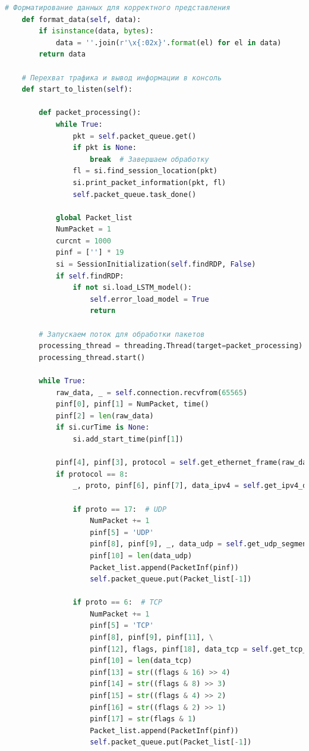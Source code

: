 \documentclass[spec, och, diploma]{SCWorks}
\begin{document}
\begin{lstlisting}[language=Python]
    # Форматирование данных для корректного представления
    def format_data(self, data):
        if isinstance(data, bytes):
            data = ''.join(r'\x{:02x}'.format(el) for el in data)
        return data

    # Перехват трафика и вывод информации в консоль
    def start_to_listen(self):
        
        def packet_processing():
            while True:
                pkt = self.packet_queue.get()
                if pkt is None:
                    break  # Завершаем обработку
                fl = si.find_session_location(pkt)
                si.print_packet_information(pkt, fl)
                self.packet_queue.task_done()

            global Packet_list
            NumPacket = 1
            curcnt = 1000
            pinf = [''] * 19
            si = SessionInitialization(self.findRDP, False)
            if self.findRDP:
                if not si.load_LSTM_model():
                    self.error_load_model = True
                    return

        # Запускаем поток для обработки пакетов
        processing_thread = threading.Thread(target=packet_processing)
        processing_thread.start()

        while True:
            raw_data, _ = self.connection.recvfrom(65565)
            pinf[0], pinf[1] = NumPacket, time()
            pinf[2] = len(raw_data)
            if si.curTime is None:
                si.add_start_time(pinf[1])

            pinf[4], pinf[3], protocol = self.get_ethernet_frame(raw_data)
            if protocol == 8:
                _, proto, pinf[6], pinf[7], data_ipv4 = self.get_ipv4_data(raw_data[14:])

                if proto == 17:  # UDP
                    NumPacket += 1
                    pinf[5] = 'UDP'
                    pinf[8], pinf[9], _, data_udp = self.get_udp_segment(data_ipv4)
                    pinf[10] = len(data_udp)
                    Packet_list.append(PacketInf(pinf))
                    self.packet_queue.put(Packet_list[-1])

                if proto == 6:  # TCP
                    NumPacket += 1
                    pinf[5] = 'TCP'
                    pinf[8], pinf[9], pinf[11], \
                    pinf[12], flags, pinf[18], data_tcp = self.get_tcp_segment(data_ipv4)
                    pinf[10] = len(data_tcp)
                    pinf[13] = str((flags & 16) >> 4)
                    pinf[14] = str((flags & 8) >> 3)
                    pinf[15] = str((flags & 4) >> 2)
                    pinf[16] = str((flags & 2) >> 1)
                    pinf[17] = str(flags & 1)
                    Packet_list.append(PacketInf(pinf))
                    self.packet_queue.put(Packet_list[-1])


\end{lstlisting}
\end{document}
